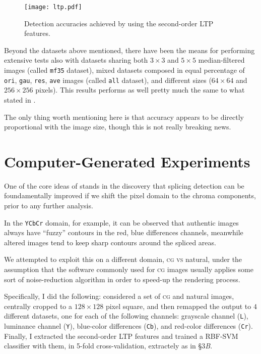 \documentclass[10pt,a4paper]{report}
\newcommand{\code}[1]{\texttt{#1}}
\begin{document}
\begin{figure}[h!]
  \centering
    \texttt{[image: ltp.pdf]}
  \caption{Detection accuracies achieved by using the second-order LTP
    features.\label{img:ltp}}
\end{figure}

Beyond the datasets above mentioned, there have been the means for performing
extensive tests also with datasets sharing both $3 \times 3$ and $5 \times 5$
median-filtered images (called \code{mf35} dataset), mixed datasets composed in
equal percentage of \code{ori}, \code{gau}, \code{res}, \code{ave} images (called
\code{all} dataset), and different sizes ($64 \times 64$ and $256 \times 256$
pixels). This results performs as well pretty much the same to what stated in
\cite{mediantraces}.

The only thing worth mentioning here is that accuracy appears to be
directly proportional with the image size, though this is not really breaking news.

\section{Computer-Generated Experiments}

One of the core ideas of \cite{splicing} stands in the discovery that
splicing detection can be foundamentally improved if we shift the pixel domain to the
chroma components, prior to any further analysis.

In the \texttt{YCbCr} domain, for example, it can be observed that authentic
images always have ``fuzzy'' contours in the red, blue differences channels,
meanwhile altered images tend to keep sharp contours around the spliced areas.

We attempted to exploit this on a different domain, \textsc{cg vs} natural,
under the assumption that the software commonly used for \textsc{cg} images
usually applies some sort of noise-reduction algorithm in order to speed-up the
rendering process.

Specifically, I did the following: considered a set of \textsc{cg} and natural images,
centrally cropped to a $128 \times 128$ pixel square, and then
remapped the output to $4$ different datasets, one for each of the following
channels: grayscale channel (\code{L}), luminance channel (\code{Y}), blue-color
differences (\code{Cb}), and red-color differences (\code{Cr}).
Finally, I extracted the second-order LTP features and trained a RBF-SVM
classifier with them, in 5-fold cross-validation, extractely as in
\cite{mediantraces} \S 3\textit{B}.
\end{document}
